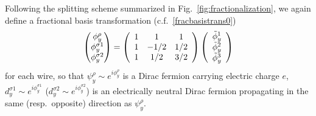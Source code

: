 
Following the splitting scheme summarized in Fig.~\ref{fig:fractionalization}, we again define a fractional basis transformation (c.f.~\eqref{fracbasistrans0}) \begin{align}\begin{pmatrix}\phi^\rho_y\\\phi^{\sigma1}_y\\\phi^{\sigma2}_y\end{pmatrix}=\left(\begin{array}{*{20}c}1&1&1\\1&-1/2&1/2\\1&1/2&3/2\end{array}\right)\left(\begin{array}{*{20}c}\tilde\phi^1_y\\\tilde\phi^2_y\\\tilde\phi^3_y\end{array}\right)\label{fracbasistrans}\end{align} for each wire, so that $\psi^\rho_y\sim e^{i\phi^\rho_y}$ is a Dirac fermion carrying electric charge $e$, $d^{\sigma1}_y\sim e^{i\phi^{\sigma1}_y}$ ($d^{\sigma2}_y\sim e^{i\phi^{\sigma2}_y}$) is an electrically neutral Dirac fermion propagating in the same (resp.~opposite) direction as $\psi^\rho_y$.

